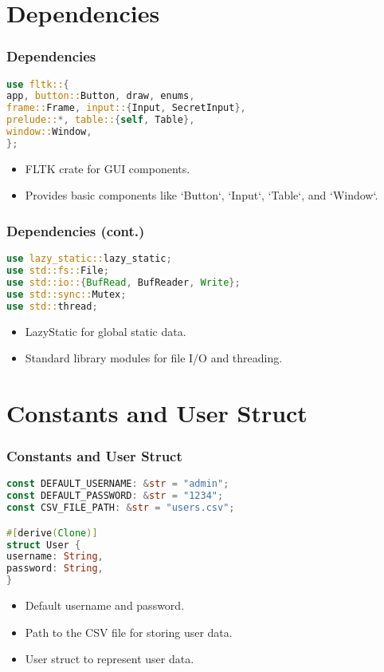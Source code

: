 \documentclass[aspectratio=169, table]{beamer}
\begin{document}
\section{Dependencies}
\begin{frame}[fragile]
\frametitle{Dependencies}
\begin{lstlisting}[language=Rust]
use fltk::{
app, button::Button, draw, enums,
frame::Frame, input::{Input, SecretInput},
prelude::*, table::{self, Table},
window::Window,
};
\end{lstlisting}
\begin{itemize}
\item FLTK crate for GUI components.
\item Provides basic components like `Button`, `Input`, `Table`, and `Window`.
\end{itemize}
\end{frame}

\begin{frame}[fragile]
\frametitle{Dependencies (cont.)}
\begin{lstlisting}[language=Rust]
use lazy_static::lazy_static;
use std::fs::File;
use std::io::{BufRead, BufReader, Write};
use std::sync::Mutex;
use std::thread;
\end{lstlisting}
\begin{itemize}
\item LazyStatic for global static data.
\item Standard library modules for file I/O and threading.
\end{itemize}
\end{frame}

\section{Constants and User Struct}
\begin{frame}[fragile]
\frametitle{Constants and User Struct}
\begin{lstlisting}[language=Rust]
const DEFAULT_USERNAME: &str = "admin";
const DEFAULT_PASSWORD: &str = "1234";
const CSV_FILE_PATH: &str = "users.csv";

#[derive(Clone)]
struct User {
username: String,
password: String,
}
\end{lstlisting}
\begin{itemize}
\item Default username and password.
\item Path to the CSV file for storing user data.
\item User struct to represent user data.
\end{itemize}
\end{frame}
\end{document}
